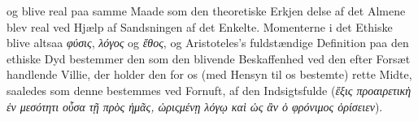 \documentclass[12pt,a4paper]{book}
\newcommand{\gk}[1]{\textit{#1}}
\begin{document}
og blive real paa samme Maade som den theoretiske Erkjen\-%
delse af det Almene blev real ved Hjælp af Sandsningen af
det Enkelte. Momenterne i det Ethiske blive altsaa \gk{φύσις},
\gk{λόγος} og \gk{ἔθος}, og Aristoteles's fuldstændige Definition paa den
ethiske Dyd bestemmer den som den blivende Beskaffenhed
ved den efter Forsæt handlende Villie, der holder den for os
(med Hensyn til os bestemte) rette Midte, saaledes som denne
bestemmes ved Fornuft, af den Indsigtsfulde (\gk{ἕξις προαιρετικὴ
%
ἐν μεσότητι οὖσα τῇ πρὸς ἡμᾶς, ὡριςμένῃ λόγῳ καὶ ὡς ἂν ὁ
φρόνιμος ὁρίσειεν}).
\end{document}
